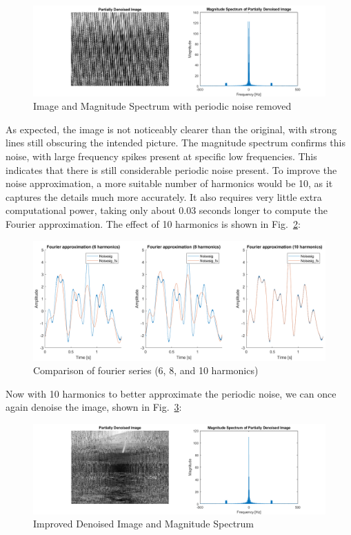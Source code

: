 \documentclass[12pt]{article}
\numberwithin{equation}{section}
\numberwithin{figure}{section}
\numberwithin{table}{section}
\begin{document}
\begin{figure}[ht]
    \centering
    \includegraphics{figures/p2-im1.png}
    \caption{Image and Magnitude Spectrum with periodic noise removed\label{fig:p2-im1}}
\end{figure}

As expected, the image is not noticeably clearer than the original, with strong
lines still obscuring the intended picture. The magnitude spectrum confirms
this noise, with large frequency spikes present at specific low frequencies.
This indicates that there is still considerable periodic noise present. To
improve the noise approximation, a more suitable number of harmonics would be
10, as it captures the details much more accurately. It also requires very
little extra computational power, taking only about 0.03 seconds longer to
compute the Fourier approximation. The effect of 10 harmonics is shown in
Fig.~\ref{fig:p2-compharms}:

\begin{figure}[ht]
    \centering
    \includegraphics{figures/p2-compharms.png}
    \caption{Comparison of fourier series (6, 8, and 10 harmonics)\label{fig:p2-compharms}}
\end{figure}

Now with 10 harmonics to better approximate the periodic noise, we can once
again denoise the image, shown in Fig.~\ref{fig:p2-im1improved}:

\begin{figure}[ht]
    \centering
    \includegraphics{figures/p2-im1improved.png}
    \caption{Improved Denoised Image and Magnitude Spectrum\label{fig:p2-im1improved}}
\end{figure}
\end{document}
